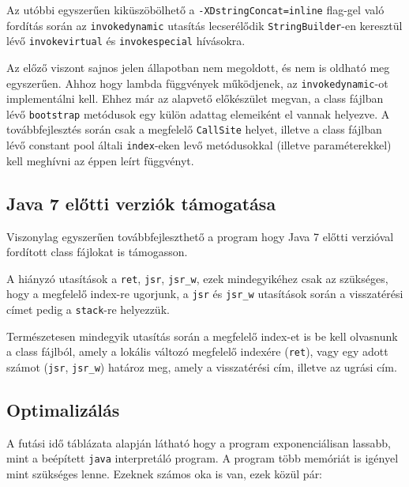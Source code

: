Az utóbbi egyszerűen kiküszöbölhető a \lstinline{-XDstringConcat=inline} flag-gel való fordítás során az \lstinline{invokedynamic} utasítás lecserélődik \lstinline{StringBuilder}-en keresztül lévő \lstinline{invokevirtual} és \lstinline{invokespecial} hívásokra.

Az előző viszont sajnos jelen állapotban nem megoldott, és nem is oldható meg egyszerűen. Ahhoz hogy lambda függvények működjenek, az \lstinline{invokedynamic}-ot implementálni kell. Ehhez már az alapvető előkészület megvan, a class fájlban lévő \lstinline{bootstrap} metódusok egy külön adattag elemeiként el vannak helyezve. A továbbfejlesztés során csak a megfelelő \lstinline{CallSite} helyet, illetve a class fájlban lévő constant pool általi \lstinline{index}-eken levő metódusokkal (illetve paraméterekkel) kell meghívni az éppen leírt függvényt.

\subsection{Java 7 előtti verziók támogatása}

Viszonylag egyszerűen továbbfejleszthető a program hogy Java 7 előtti verzióval fordított class fájlokat is támogasson.

A hiányzó utasítások a \lstinline{ret}, \lstinline{jsr}, \lstinline{jsr_w}, ezek mindegyikéhez csak az szükséges, hogy a megfelelő index-re ugorjunk, a \lstinline{jsr} és \lstinline{jsr_w} utasítások során a visszatérési címet pedig a \lstinline{stack}-re helyezzük.

Természetesen mindegyik utasítás során a megfelelő index-et is be kell olvasnunk a class fájlból, amely a lokális változó megfelelő indexére (\lstinline{ret}), vagy egy adott számot (\lstinline{jsr}, \lstinline{jsr_w}) határoz meg, amely a visszatérési cím, illetve az ugrási cím.

\subsection{Optimalizálás}

A futási idő táblázata alapján látható hogy a program exponenciálisan lassabb, mint a beépített \lstinline{java} interpretáló program. A program több memóriát is igényel mint szükséges lenne. Ezeknek számos oka is van, ezek közül pár:

